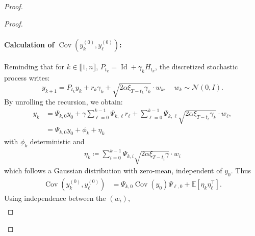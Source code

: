 \documentclass[11pt]{article}
\newcommand{\eqdef}{\coloneqq}
\newcommand{\id}{\operatorname{Id}}
\newcommand{\EE}{\mathbb{E}}
\newcommand{\cov}{\operatorname{Cov}}
\begin{document}
\begin{proof}
\begin{proof}
\paragraph{Calculation of $\cov(y^{(0)}_{k}, y^{(0)}_{\ell})$:}
Reminding that for $k \in \llbracket 1, n \rrbracket$, $P_{t_k} = \id + \gamma_k H_{t_k} $, the discretized stochastic process writes:
\begin{equation*}
    y_{k+1} = P_{t_k} y_k + r_k \gamma_k + \sqrt{2\alpha \xi_{T - t_k} \gamma_k} \cdot w_k, \quad w_k \sim \mathcal{N}(0, I).
\end{equation*}
By unrolling the recursion, we obtain:
\begin{align*}
    y_k &= \Psi_{k,0} y_0 + \gamma \sum_{\ell=0}^{k-1} \Psi_{k,\ell} r_\ell  + \sum_{\ell=0}^{k-1}\Psi_{k,\ell} \sqrt{2\alpha \xi_{T - t_\ell} \gamma_k} \cdot w_\ell, \\
    &= \Psi_{k,0} y_0 + \phi_k  + \eta_k
\end{align*}
with $\phi_k$ deterministic and 
\begin{align*}
\eta_k \eqdef \sum_{i=0}^{k-1}\Psi_{k,i} \sqrt{2\alpha \xi_{T - t_i} \gamma} \cdot w_i
\end{align*}
which follows a Gaussian distribution with zero-mean, independent of $y_0$. 
Thus
\begin{align*}
\cov(y^{(0)}_k, y^{(0)}_\ell) &= \Psi_{k,0} \cov(y_0) \Psi_{\ell,0}
+ \EE[\eta_k \eta_{\ell}^\top] .
\end{align*}
Using independence between the $(w_i)$,
\begin{align*}

\end{align*}
\end{proof}
\end{proof}
\end{document}
